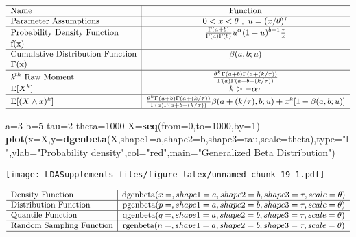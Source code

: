 \documentclass[]{book}
\newenvironment{Shaded}{\begin{snugshade}}{\end{snugshade}}
\newcommand{\KeywordTok}[1]{\textcolor[rgb]{0.13,0.29,0.53}{\textbf{#1}}}
\newcommand{\DataTypeTok}[1]{\textcolor[rgb]{0.13,0.29,0.53}{#1}}
\newcommand{\DecValTok}[1]{\textcolor[rgb]{0.00,0.00,0.81}{#1}}
\newcommand{\StringTok}[1]{\textcolor[rgb]{0.31,0.60,0.02}{#1}}
\newcommand{\NormalTok}[1]{#1}
\begin{document}
\[
{\small
\begin{matrix}
\begin{array}{l|c}
\hline
  \text{Name} & \text{Function} \\
\hline
  \text{Parameter Assumptions} & 0<x<\theta~,~u=(x/\theta)^\tau \\
\hline
  \text{Probability Density Function} & \frac{\Gamma(a+b)}{\Gamma(a)\Gamma(b)}u^\alpha(1-u)^{b-1}\frac{\tau}{x} \\
    \text{f(x)} & \\
\hline
  \text{Cumulative Distribution Function} & \beta(a,b;u) \\
    \text{F(x)} & \\
\hline
  \textit{k}^{th}~\text{Raw Moment} & \frac{\theta^k\Gamma(a+b)\Gamma(a+(k/\tau))}{\Gamma(a)\Gamma(a+b+(k/\tau))} \\
   \mathrm{E}[X^k] & k>-\alpha\tau \\
\hline
  \mathrm{E}[(X\wedge x)^k] & \frac{\theta^k\Gamma(a+b)\Gamma(a+(k/\tau))}{\Gamma(a)\Gamma(a+b+(k/\tau))}\beta(a+(k/\tau),b;u)+x^k[1-\beta(a,b;u)] \\
\hline
\end{array}
\end{matrix}
}
\]

\begin{Shaded}
\begin{Highlighting}[]
\NormalTok{a=}\DecValTok{3}
\NormalTok{b=}\DecValTok{5}
\NormalTok{tau=}\DecValTok{2}
\NormalTok{theta=}\DecValTok{1000}
\NormalTok{X=}\KeywordTok{seq}\NormalTok{(}\DataTypeTok{from=}\DecValTok{0}\NormalTok{,}\DataTypeTok{to=}\DecValTok{1000}\NormalTok{,}\DataTypeTok{by=}\DecValTok{1}\NormalTok{)}
\KeywordTok{plot}\NormalTok{(}\DataTypeTok{x=}\NormalTok{X,}\DataTypeTok{y=}\KeywordTok{dgenbeta}\NormalTok{(X,}\DataTypeTok{shape1=}\NormalTok{a,}\DataTypeTok{shape2=}\NormalTok{b,}\DataTypeTok{shape3=}\NormalTok{tau,}\DataTypeTok{scale=}\NormalTok{theta),}\DataTypeTok{type=}\StringTok{"l"}\NormalTok{,}\DataTypeTok{ylab=}\StringTok{"Probability density"}\NormalTok{,}\DataTypeTok{col=}\StringTok{"red"}\NormalTok{,}\DataTypeTok{main=}\StringTok{"Generalized Beta Distribution"}\NormalTok{)}
\end{Highlighting}
\end{Shaded}

\texttt{[image: LDASupplements\_files/figure-latex/unnamed-chunk-19-1.pdf]}

\[
{\small
\begin{matrix}
\begin{array}{l|c}
\hline
  \text{Density Function} & \text{dgenbeta}(x=, shape1=a,shape2=b,shape3=\tau,scale=\theta) \\
\hline
  \text{Distribution Function} & \text{pgenbeta}(p=, shape1=a,shape2=b,shape3=\tau,scale=\theta) \\
\hline
  \text{Quantile Function} & \text{qgenbeta}(q=, shape1=a,shape2=b,shape3=\tau,scale=\theta) \\ 
\hline
  \text{Random Sampling Function} & \text{rgenbeta}(n=, shape1=a,shape2=b,shape3=\tau,scale=\theta) \\
\hline
\end{array}
\end{matrix}
}
\]
\end{document}
